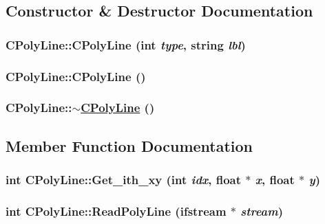 \subsection{Constructor \& Destructor Documentation}
\hypertarget{classCPolyLine_a0}{
\subsubsection[CPolyLine]{\setlength{\rightskip}{0pt plus 5cm}CPoly\-Line::CPoly\-Line (int {\em type}, string {\em lbl})}}
\label{classCPolyLine_a0}


\hypertarget{classCPolyLine_a1}{
\subsubsection[CPolyLine]{\setlength{\rightskip}{0pt plus 5cm}CPoly\-Line::CPoly\-Line ()}}
\label{classCPolyLine_a1}


\hypertarget{classCPolyLine_a2}{
\subsubsection[$\sim$CPolyLine]{\setlength{\rightskip}{0pt plus 5cm}CPoly\-Line::$\sim$\hyperlink{classCPolyLine}{CPoly\-Line} ()}}
\label{classCPolyLine_a2}




\subsection{Member Function Documentation}
\hypertarget{classCPolyLine_a4}{
\subsubsection[Get\_\-ith\_\-xy]{\setlength{\rightskip}{0pt plus 5cm}int CPoly\-Line::Get\_\-ith\_\-xy (int {\em idx}, float $\ast$ {\em x}, float $\ast$ {\em y})}}
\label{classCPolyLine_a4}


\hypertarget{classCPolyLine_a6}{
\subsubsection[ReadPolyLine]{\setlength{\rightskip}{0pt plus 5cm}int CPoly\-Line::Read\-Poly\-Line (ifstream $\ast$ {\em stream})}}
\label{classCPolyLine_a6}


